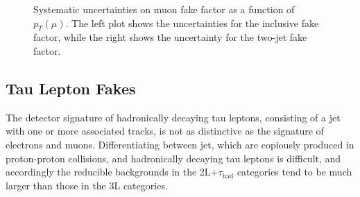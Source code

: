 \begin{figure}
  \centering
  \caption{Systematic uncertainties on muon fake factor as a function of $p_{T}(\mu)$.  The left plot shows the uncertainties for the inclusive fake factor, while the right shows the uncertainty for the two-jet fake factor.}
  \label{fig:MuFake_syst}
\end{figure}



\subsection{Tau Lepton Fakes}\label{sec:ff-tau}
The detector signature of hadronically decaying tau leptons, consisting of a jet with one or more associated tracks, is not as distinctive as the signature of electrons and muons. Differentiating between jet, which are copiously produced in proton-proton collisions, and hadronically decaying tau leptons is difficult, and accordingly the reducible backgrounds in the 2L$+\tau_{\mathrm{had}}$ categories tend to be much larger than those in the 3L categories. 

